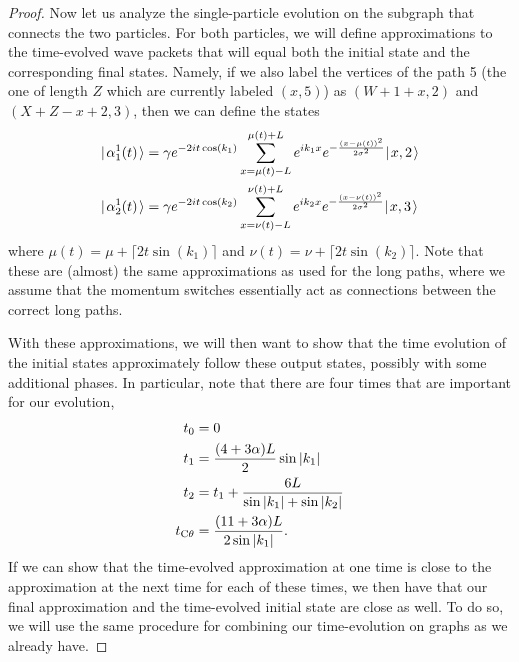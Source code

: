 \documentclass[../thesis-main/thesis-main]{subfiles}
\begin{document}
\begin{proof}
Now let us analyze the single-particle evolution on the subgraph that connects the two particles.  For both particles, we will define approximations to the time-evolved wave packets that will equal both the initial state and the corresponding final states.  Namely, if we also label the vertices of the path 5 (the one of length $Z$ which are currently labeled $(x,5)$) as $(W+1+x,2)$ and $(X + Z - x+2,3)$, then we can define the states 
\begin{align}
  |\mspace{2mu} \alpha_{1}^1(t) \mspace{2mu} \rangle &= \gamma e^{-2 i t \cos(k_1)} \sum_{x = \mu(t) - L}^{\mu(t) + L} e^{ i k_1 x} e^{-\frac{(x-\mu(t))^2}{2\sigma^2}} |\mspace{2mu} x,2 \mspace{2mu} \rangle\\
  |\mspace{2mu} \alpha_{2}^1(t) \mspace{2mu} \rangle &= \gamma e^{-2 i t \cos(k_2)} \sum_{x = \nu(t) - L} ^{\nu(t) + L} e^{i k_2 x} e^{-\frac{(x-\nu(t))^2}{2\sigma^2}} |\mspace{2mu} x,3 \mspace{2mu} \rangle
\end{align}
where $\mu(t) = \mu + \lceil 2 t \sin (k_1)\rceil$ and $\nu(t) = \nu + \lceil 2 t \sin (k_2)\rceil$.  Note that these are (almost) the same approximations as used for the long paths, where we assume that the momentum switches essentially act as connections between the correct long paths.

With these approximations, we will then want to show that the time evolution of the initial states approximately follow these output states, possibly with some additional phases.  In particular, note that there are four times that are important for our evolution,
\begin{align}
  t_0 &= 0\\
  t_1 &= \frac{(4 + 3 \alpha)L}{2} \sin |k_1|\\
  t_2 &= t_1 + \frac{6L}{\sin |k_1| + \sin |k_2|}\\
  t_{\mathrm{C}\theta} &= \frac{(11 +3\alpha) L}{2 \sin |k_1|}.
\end{align}
If we can show that the time-evolved approximation at one time is close to the approximation at the next time for each of these times, we then have that our final approximation and the time-evolved initial state are close as well.  To do so, we will use the same procedure for combining our time-evolution on graphs as we already have.


\end{proof}
\end{document}
